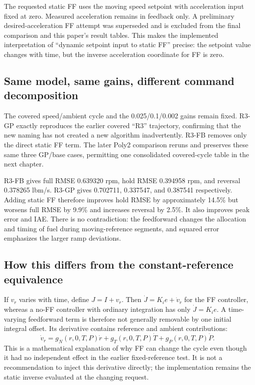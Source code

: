 The requested static FF uses the moving speed setpoint with acceleration input fixed at zero. Measured acceleration remains in feedback only. A preliminary desired-acceleration FF attempt was superseded and is excluded from the final comparison and this paper's result tables. This makes the implemented interpretation of ``dynamic setpoint input to static FF'' precise: the setpoint value changes with time, but the inverse acceleration coordinate for FF is zero.

\subsection{Same model, same gains, different command decomposition}
The covered speed/ambient cycle and the 0.025/0.1/0.002 gains remain fixed. R3-GP exactly reproduces the earlier covered ``R3'' trajectory, confirming that the new naming has not created a new algorithm inadvertently. R3-FB removes only the direct static FF term. The later Poly2 comparison reruns and preserves these same three GP/base cases, permitting one consolidated covered-cycle table in the next chapter.

R3-FB gives full RMSE 0.639320 rpm, hold RMSE 0.394958 rpm, and reversal 0.378265 lbm/s. R3-GP gives 0.702711, 0.337547, and 0.387541 respectively. Adding static FF therefore improves hold RMSE by approximately 14.5\% but worsens full RMSE by 9.9\% and increases reversal by 2.5\%. It also improves peak error and IAE. There is no contradiction: the feedforward changes the allocation and timing of fuel during moving-reference segments, and squared error emphasizes the larger ramp deviations.


\subsection{How this differs from the constant-reference equivalence}
If $v_r$ varies with time, define $J=I+v_r$. Then $\dot J=K_ie+\dot v_r$ for the FF controller, whereas a no-FF controller with ordinary integration has only $\dot J=K_ie$. A time-varying feedforward term is therefore not generally removable by one initial integral offset. Its derivative contains reference and ambient contributions:
\begin{equation}
\dot v_r=g_N(r,0,T,P)\dot r+g_T(r,0,T,P)\dot T+g_P(r,0,T,P)\dot P.
\end{equation}
This is a mathematical explanation of why FF can change the cycle even though it had no independent effect in the earlier fixed-reference test. It is not a recommendation to inject this derivative directly; the implementation remains the static inverse evaluated at the changing request.





